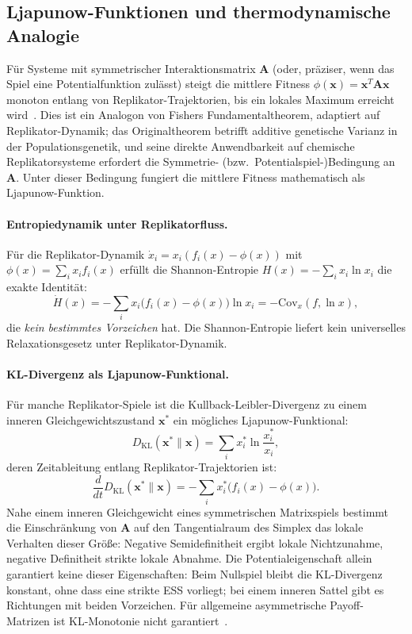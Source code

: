 \documentclass[12pt,a4paper]{article}
\theoremstyle{remark}
\begin{document}
\subsection{Ljapunow-Funktionen und thermodynamische Analogie}

Für Systeme mit symmetrischer Interaktionsmatrix $\mathbf{A}$ (oder, präziser, wenn das Spiel eine Potentialfunktion zulässt) steigt die mittlere Fitness $\phi(\mathbf{x}) = \mathbf{x}^T \mathbf{A} \mathbf{x}$ monoton entlang von Replikator-Trajektorien, bis ein lokales Maximum erreicht wird~\citep{ReplicatorEntropy}. Dies ist ein Analogon von Fishers Fundamentaltheorem, adaptiert auf Replikator-Dynamik; das Originaltheorem betrifft additive genetische Varianz in der Populationsgenetik, und seine direkte Anwendbarkeit auf chemische Replikatorsysteme erfordert die Symmetrie- (bzw.\ Potentialspiel-)Bedingung an $\mathbf{A}$. Unter dieser Bedingung fungiert die mittlere Fitness mathematisch als Ljapunow-Funktion.

\paragraph{Entropiedynamik unter Replikatorfluss.}
Für die Replikator-Dynamik $\dot{x}_i = x_i(f_i(x) - \phi(x))$ mit $\phi(x) = \sum_i x_i f_i(x)$ erfüllt die Shannon-Entropie $H(x) = -\sum_i x_i \ln x_i$ die exakte Identität:
\begin{equation}
\dot{H}(x) = -\sum_i x_i \big(f_i(x) - \phi(x)\big) \ln x_i = -\mathrm{Cov}_x(f, \ln x),
\end{equation}
die \emph{kein bestimmtes Vorzeichen} hat. Die Shannon-Entropie liefert kein universelles Relaxationsgesetz unter Replikator-Dynamik.

\paragraph{KL-Divergenz als Ljapunow-Funktional.}
Für manche Replikator-Spiele ist die Kullback-Leibler-Divergenz zu einem inneren Gleichgewichtszustand $\mathbf{x}^*$ ein mögliches Ljapunow-Funktional:
\begin{equation}
D_{\mathrm{KL}}(\mathbf{x}^* \| \mathbf{x}) = \sum_i x_i^* \ln \frac{x_i^*}{x_i},
\end{equation}
deren Zeitableitung entlang Replikator-Trajektorien ist:
\begin{equation}
\frac{d}{dt} D_{\mathrm{KL}}(\mathbf{x}^* \| \mathbf{x}) = -\sum_i x_i^* \big(f_i(x) - \phi(x)\big).
\end{equation}
Nahe einem inneren Gleichgewicht eines symmetrischen Matrixspiels bestimmt die Einschränkung von $\mathbf{A}$ auf den Tangentialraum des Simplex das lokale Verhalten dieser Größe: Negative Semidefinitheit ergibt lokale Nichtzunahme, negative Definitheit strikte lokale Abnahme. Die Potentialeigenschaft allein garantiert keine dieser Eigenschaften: Beim Nullspiel bleibt die KL-Divergenz konstant, ohne dass eine strikte ESS vorliegt; bei einem inneren Sattel gibt es Richtungen mit beiden Vorzeichen. Für allgemeine asymmetrische Payoff-Matrizen ist KL-Monotonie nicht garantiert~\citep{HofbauerSigmund1998,ReplicatorEntropy}.
\end{document}
